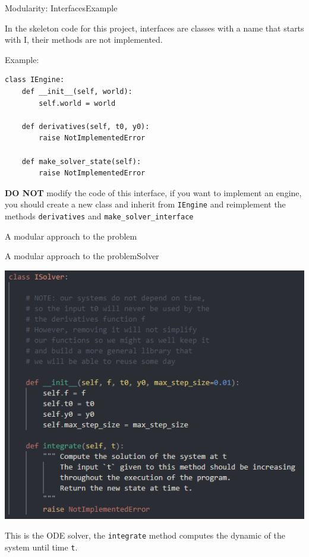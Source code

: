 \documentclass[colorlinks]{beamer}
\begin{document}
\begin{frame}[fragile]{Modularity: Interfaces}{Example}
    
    In the skeleton code for this project, interfaces are classes with a name that starts with I, their methods are not implemented. \\
    {\small Example:
    \begin{verbatim}
class IEngine:
    def __init__(self, world):
        self.world = world

    def derivatives(self, t0, y0):
        raise NotImplementedError

    def make_solver_state(self):
        raise NotImplementedError
    \end{verbatim}
    }

    \textbf{DO NOT} modify the code of this interface, if you want to implement an engine, you should create a new class and inherit from \texttt{IEngine} and reimplement the methods \texttt{derivatives} and \texttt{make_solver_interface}

\end{frame}

\begin{frame}\centering\huge A modular approach to the problem\end{frame}

\begin{frame}{A modular approach to the problem}{Solver}
    {
        \centering
        \includegraphics[height=.6\textheight]{ISolver.png}
        \par
    }

    This is the ODE solver, the \texttt{integrate} method computes the dynamic of the system until time \texttt{t}.

\end{frame}
\end{document}
